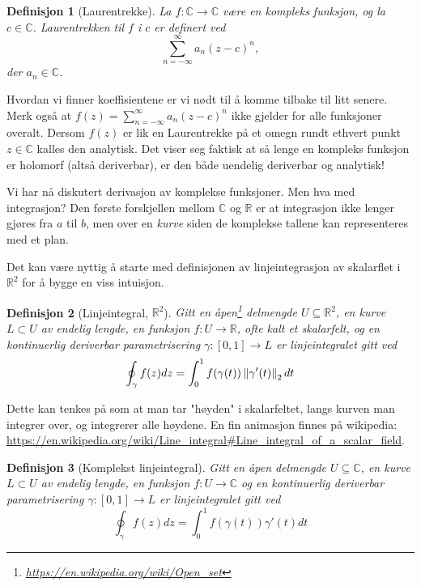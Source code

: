 \documentclass{article}
\newtheorem{definition}{Definisjon}
\begin{document}
\begin{definition}[Laurentrekke]
    La $f: \mathbb{C} \longrightarrow \mathbb{C}$ være en kompleks funksjon, og la $c \in \mathbb{C}$. Laurentrekken til $f$ i $c$ er definert ved \[
    \sum_{n=-\infty}^\infty a_n (z - c)^n,
    \] der $a_n \in \mathbb{C}$.
\end{definition}

Hvordan vi finner koeffisientene er vi nødt til å komme tilbake til litt senere. Merk også at $f(z) = \sum_{n=-\infty}^\infty a_n (z - c)^n$ ikke gjelder for alle funksjoner overalt. Dersom $f(z)$ er lik en Laurentrekke på et omegn rundt ethvert punkt $z \in \mathbb{C}$ kalles den analytisk. Det viser seg faktisk at så lenge en kompleks funksjon er holomorf (altså deriverbar), er den både uendelig deriverbar og analytisk!

Vi har nå diskutert derivasjon av komplekse funksjoner. Men hva med integrasjon? Den første forskjellen mellom $\mathbb{C}$ og $\mathbb{R}$ er at integrasjon ikke lenger gjøres fra $a$ til $b$, men over en \textit{kurve} siden de komplekse tallene kan representeres med et plan.

Det kan være nyttig å starte med definisjonen av linjeintegrasjon av skalarflet i $\mathbb{R}^2$ for å bygge en viss intuisjon.

\begin{definition}[Linjeintegral, $\mathbb{R}^2$]
    Gitt en åpen\footnote{\url{https://en.wikipedia.org/wiki/Open_set}} delmengde $U \subseteq \mathbb{R}^2$, en kurve $L \subset U$ av endelig lengde, en funksjon $f:U \longrightarrow \mathbb{R}$, ofte kalt et skalarfelt, og en kontinuerlig deriverbar parametrisering $\gamma : [0, 1] \longrightarrow L$ er linjeintegralet gitt ved \[
        \oint_\gamma f(z)dz = \int_0^1 f(\gamma(t)) \left\lVert\gamma'(t)\right\rVert_2 dt
    \]
\end{definition}

Dette kan tenkes på som at man tar "høyden" i skalarfeltet, langs kurven man integrer over, og integrerer alle høydene. En fin animasjon finnes på wikipedia: \url{https://en.wikipedia.org/wiki/Line_integral#Line_integral_of_a_scalar_field}.

\begin{definition}[Komplekst linjeintegral]
    Gitt en åpen delmengde $U \subseteq \mathbb{C}$, en kurve $L \subset U$ av endelig lengde, en funksjon $f:U \longrightarrow \mathbb{C}$ og en kontinuerlig deriverbar parametrisering $\gamma : [0, 1] \longrightarrow L$ er linjeintegralet gitt ved \[
        \oint_\gamma f(z)dz = \int_0^1 f(\gamma(t)) \gamma'(t) dt
    \]
\end{definition}
\end{document}
